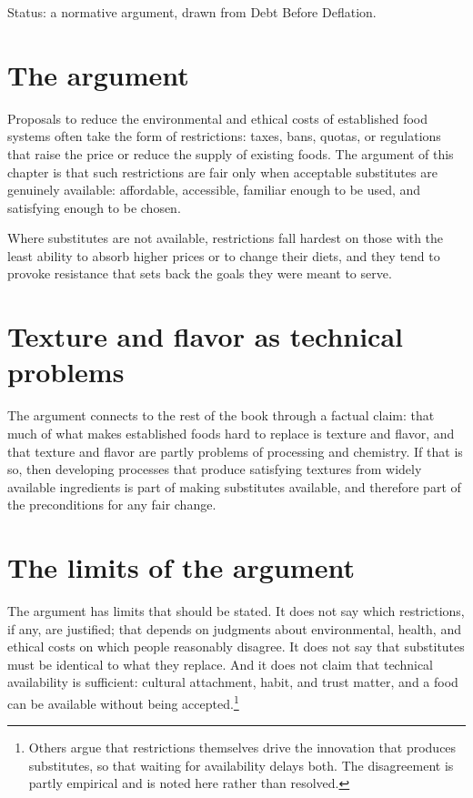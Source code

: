 \documentclass[11pt,openany]{book}
\theoremstyle{definition}
\begin{document}
Status: a normative argument, drawn from Debt Before Deflation.

\section{The argument}

Proposals to reduce the environmental and ethical costs of established food systems often take the form of restrictions: taxes, bans, quotas, or regulations that raise the price or reduce the supply of existing foods. The argument of this chapter is that such restrictions are fair only when acceptable substitutes are genuinely available: affordable, accessible, familiar enough to be used, and satisfying enough to be chosen.

Where substitutes are not available, restrictions fall hardest on those with the least ability to absorb higher prices or to change their diets, and they tend to provoke resistance that sets back the goals they were meant to serve.

\section{Texture and flavor as technical problems}

The argument connects to the rest of the book through a factual claim: that much of what makes established foods hard to replace is texture and flavor, and that texture and flavor are partly problems of processing and chemistry. If that is so, then developing processes that produce satisfying textures from widely available ingredients is part of making substitutes available, and therefore part of the preconditions for any fair change.

\section{The limits of the argument}

The argument has limits that should be stated. It does not say which restrictions, if any, are justified; that depends on judgments about environmental, health, and ethical costs on which people reasonably disagree. It does not say that substitutes must be identical to what they replace. And it does not claim that technical availability is sufficient: cultural attachment, habit, and trust matter, and a food can be available without being accepted.\footnote{Others argue that restrictions themselves drive the innovation that produces substitutes, so that waiting for availability delays both. The disagreement is partly empirical and is noted here rather than resolved.}
\end{document}
